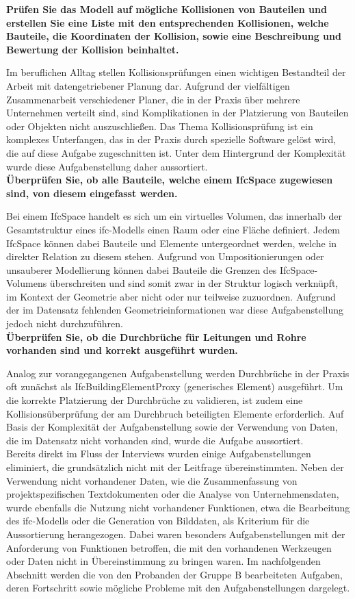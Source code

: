 \textbf{Prüfen Sie das Modell auf mögliche Kollisionen von Bauteilen und erstellen Sie eine Liste mit den entsprechenden Kollisionen, welche Bauteile, die Koordinaten der Kollision, sowie eine Beschreibung und Bewertung der Kollision beinhaltet.}

Im beruflichen Alltag stellen Kollisionsprüfungen einen wichtigen Bestandteil der Arbeit mit datengetriebener Planung dar.
Aufgrund der vielfältigen Zusammenarbeit verschiedener Planer, die in der Praxis über mehrere Unternehmen verteilt sind, sind Komplikationen in der Platzierung von Bauteilen oder Objekten nicht auszuschließen.
Das Thema Kollisionsprüfung ist ein komplexes Unterfangen, das in der Praxis durch spezielle Software gelöst wird, die auf diese Aufgabe zugeschnitten ist.
Unter dem Hintergrund der Komplexität wurde diese Aufgabenstellung daher aussortiert. \\

\textbf{Überprüfen Sie, ob alle Bauteile, welche einem IfcSpace zugewiesen sind, von diesem eingefasst werden.}

Bei einem IfcSpace handelt es sich um ein virtuelles Volumen, das innerhalb der Gesamtstruktur eines \gls{ifc}-Modells einen Raum oder eine Fläche definiert.
Jedem IfcSpace können dabei Bauteile und Elemente untergeordnet werden, welche in direkter Relation zu diesem stehen.
Aufgrund von Umpositionierungen oder unsauberer Modellierung können dabei Bauteile die Grenzen des IfcSpace-Volumens überschreiten und sind somit zwar in der Struktur logisch verknüpft,
im Kontext der Geometrie aber nicht oder nur teilweise zuzuordnen. Aufgrund der im Datensatz fehlenden Geometrieinformationen war diese Aufgabenstellung jedoch nicht durchzuführen. \\

\textbf{Überprüfen Sie, ob die Durchbrüche für Leitungen und Rohre vorhanden sind und korrekt ausgeführt wurden.}

Analog zur vorangegangenen Aufgabenstellung werden Durchbrüche in der Praxis oft zunächst als IfcBuildingElementProxy (generisches Element) ausgeführt.
Um die korrekte Platzierung der Durchbrüche zu validieren, ist zudem eine Kollisionsüberprüfung der am Durchbruch beteiligten Elemente erforderlich.
Auf Basis der Komplexität der Aufgabenstellung sowie der Verwendung von Daten, die im Datensatz nicht vorhanden sind, wurde die Aufgabe aussortiert. \\

Bereits direkt im Fluss der Interviews wurden einige Aufgabenstellungen eliminiert, die grundsätzlich nicht mit der Leitfrage übereinstimmten.
Neben der Verwendung nicht vorhandener Daten, wie die Zusammenfassung von projektspezifischen Textdokumenten oder die Analyse von Unternehmensdaten, wurde ebenfalls die Nutzung nicht vorhandener Funktionen, etwa die Bearbeitung des \gls{ifc}-Modells oder die Generation von Bilddaten, als Kriterium für die Aussortierung herangezogen.
Dabei waren besonders Aufgabenstellungen mit der Anforderung von Funktionen betroffen, die mit den vorhandenen Werkzeugen oder Daten nicht in Übereinstimmung zu bringen waren.
Im nachfolgenden Abschnitt werden die von den Probanden der Gruppe B bearbeiteten Aufgaben, deren Fortschritt sowie mögliche Probleme mit den Aufgabenstellungen dargelegt.


